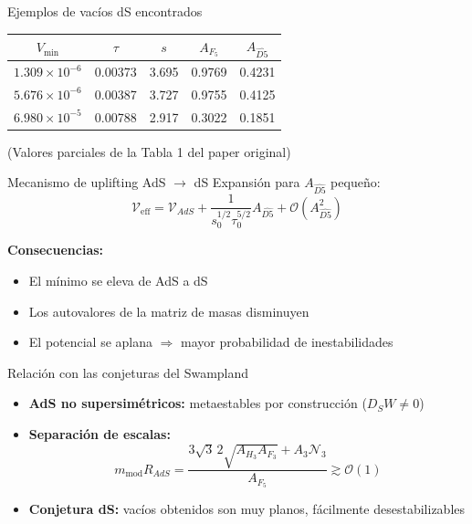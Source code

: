 \documentclass[aspectratio=169]{beamer} %
\begin{document}
\begin{frame}{Ejemplos de vacíos dS encontrados}
    \begin{center}
    \begin{tabular}{c c c c c}
        \hline
        \(V_{\min}\) & \(\tau\) & \(s\) & \(A_{F_5}\) & \(A_{\widehat{D5}}\) \\
        \hline
        \(1.309\times10^{-6}\) & 0.00373 & 3.695 & 0.9769 & 0.4231 \\
        \(5.676\times10^{-6}\) & 0.00387 & 3.727 & 0.9755 & 0.4125 \\
        \(6.980\times10^{-5}\) & 0.00788 & 2.917 & 0.3022 & 0.1851 \\
        \hline
    \end{tabular}
    \end{center}
    (Valores parciales de la Tabla 1 del paper original)
\end{frame}

\begin{frame}{Mecanismo de uplifting AdS \(\rightarrow\) dS}
    Expansión para \(A_{\widehat{D5}}\) pequeño:
    \[
    \mathcal{V}_{\text{eff}} = \mathcal{V}_{AdS} + \frac{1}{s_0^{1/2}\tau_0^{5/2}} A_{\widehat{D5}} + \mathcal{O}(A_{\widehat{D5}}^2)
    \]
    
    \textbf{Consecuencias:}
    \begin{itemize}
        \item El mínimo se eleva de AdS a dS
        \item Los autovalores de la matriz de masas disminuyen
        \item El potencial se aplana \(\Rightarrow\) mayor probabilidad de inestabilidades
    \end{itemize}
\end{frame}

\begin{frame}{Relación con las conjeturas del Swampland}
    \begin{itemize}
        \item \textbf{AdS no supersimétricos:} metaestables por construcción (\(D_S W \neq 0\))
        \item \textbf{Separación de escalas:}
        \[
        m_{\text{mod}} R_{AdS} = \frac{3\sqrt{3}\,2\sqrt{A_{H_3}A_{F_3}} + A_3\mathcal{N}_3}{A_{F_5}} \gtrsim \mathcal{O}(1)
        \]
        \item \textbf{Conjetura dS:} vacíos obtenidos son muy planos, fácilmente desestabilizables
    \end{itemize}
\end{frame}
\end{document}

